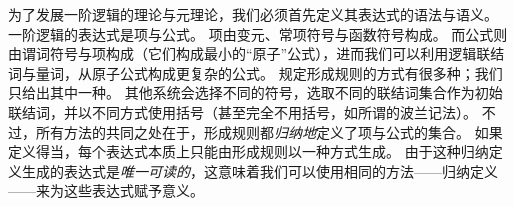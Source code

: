 \documentclass[../../../include/open-logic-section]{subfiles}
\begin{document}


为了发展一阶逻辑的理论与元理论，我们必须首先定义其表达式的语法与语义。
一阶逻辑的表达式是项与公式。
项由变元、常项符号与函数符号构成。
而公式则由谓词符号与项构成（它们构成最小的“原子”公式），进而我们可以利用逻辑联结词与量词，从原子公式构成更复杂的公式。
规定形成规则的方式有很多种；我们只给出其中一种。
其他系统会选择不同的符号，选取不同的联结词集合作为初始联结词，并以不同方式使用括号（甚至完全不用括号，如所谓的波兰记法）。
不过，所有方法的共同之处在于，形成规则都\emph{归纳地}定义了项与公式的集合。
如果定义得当，每个表达式本质上只能由形成规则以一种方式生成。
由于这种归纳定义生成的表达式是\emph{唯一可读的}，这意味着我们可以使用相同的方法——归纳定义——来为这些表达式赋予意义。
\end{document}
